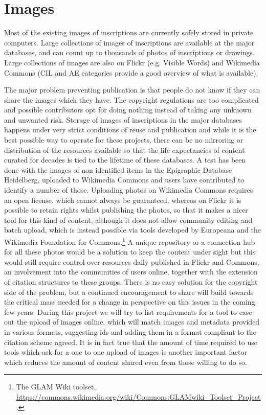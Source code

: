 \documentclass[amsthm,ebook]{saparticle}
\begin{document}
\section{Images}
Most of the existing images of inscriptions are currently safely stored in private computers. Large collections of images of inscriptions are available at the major databases, and can count up to thousands of photos of inscriptions or drawings. Large collections of images are also on Flickr (e.g. Visible Words) and Wikimedia Commons (CIL and AE categories provide a good overview of what is available).

The major problem preventing publication is that people do not know if they can share the images which they have. The copyright regulations are too complicated and possible contributors opt for doing nothing instead of taking any unknown and unwanted risk. 
Storage of images of inscriptions in the major databases happens under very strict conditions of reuse and publication and while it is the best possible way to operate for these projects, there can be no mirroring or distribution of the resources available so that the life expectancies of content curated for decades is tied to  the lifetime of these databases. A test has been done with the images of non identified items in the Epigraphic Database Heidelberg, uploaded to Wikimedia Commons and users have contributed to identify a number of those. 
Uploading photos on Wikimedia Commons requires an open license, which cannot always be guaranteed, whereas on Flickr it is possible to retain rights whilst publishing the photos, so that it makes a nicer tool for this kind of content, although it does not allow community editing and batch upload, which is instead possible via tools developed by Europeana and the Wikimedia Foundation for Commons.\footnote{The GLAM Wiki toolset, \url{https://commons.wikimedia.org/wiki/Commons:GLAMwiki_Toolset_Project}.}
A unique repository or a connection hub for all these photos would be a solution to keep the content under sight but this would still require control over resources daily published in Flickr and Commons, an involvement into the communities of users online, together with the extension of citation structures to these groups. There is no easy solution for the copyright side of the problem, but a continued encouragement to share will build towards the critical mass needed for a change in perspective on this issues in the coming few years. During this project we will try to list requirements for a tool to ease out the upload of images online, which will match images and metadata provided in various formats, suggesting ids and adding them in a format compliant to the citation scheme agreed. It is in fact true that the amount of time required to use tools which ask for a one to one upload of images is another important factor which reduces the amount of content shared even from those willing to do so.
\end{document}
